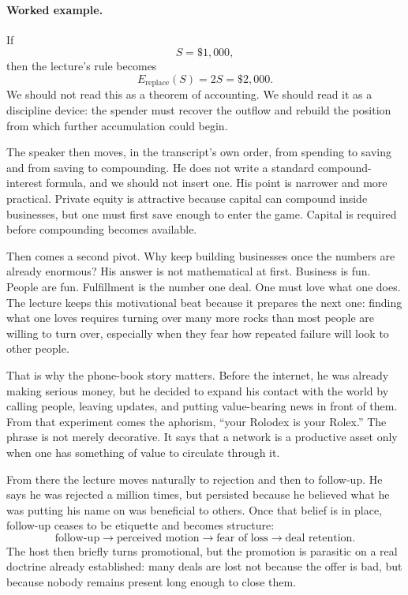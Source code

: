 \paragraph{Worked example.} If
\[
S=\$1{,}000,
\]
then the lecture's rule becomes
\[
E_{\text{replace}}(S)=2S=\$2{,}000.
\]
We should not read this as a theorem of accounting. We should read it as a discipline device: the spender must recover the outflow and rebuild the position from which further accumulation could begin.

The speaker then moves, in the transcript's own order, from spending to saving and from saving to compounding. He does not write a standard compound-interest formula, and we should not insert one. His point is narrower and more practical. Private equity is attractive because capital can compound inside businesses, but one must first save enough to enter the game. Capital is required before compounding becomes available.

Then comes a second pivot. Why keep building businesses once the numbers are already enormous? His answer is not mathematical at first. Business is fun. People are fun. Fulfillment is the number one deal. One must love what one does. The lecture keeps this motivational beat because it prepares the next one: finding what one loves requires turning over many more rocks than most people are willing to turn over, especially when they fear how repeated failure will look to other people.

That is why the phone-book story matters. Before the internet, he was already making serious money, but he decided to expand his contact with the world by calling people, leaving updates, and putting value-bearing news in front of them. From that experiment comes the aphorism, ``your Rolodex is your Rolex.'' The phrase is not merely decorative. It says that a network is a productive asset only when one has something of value to circulate through it.

From there the lecture moves naturally to rejection and then to follow-up. He says he was rejected a million times, but persisted because he believed what he was putting his name on was beneficial to others. Once that belief is in place, follow-up ceases to be etiquette and becomes structure:
\begin{equation}
\text{follow-up} \to \text{perceived motion} \to \text{fear of loss} \to \text{deal retention}.
\end{equation}
The host then briefly turns promotional, but the promotion is parasitic on a real doctrine already established: many deals are lost not because the offer is bad, but because nobody remains present long enough to close them.

